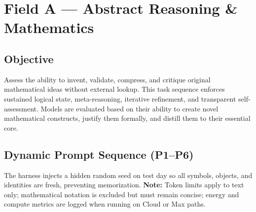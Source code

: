 \section{Field A — Abstract Reasoning \& Mathematics}
\label{sec:fieldA}

\subsection*{Objective}
Assess the ability to invent, validate, compress, and critique original mathematical ideas without external lookup. This task sequence enforces sustained logical state, meta-reasoning, iterative refinement, and transparent self-assessment. Models are evaluated based on their ability to create novel mathematical constructs, justify them formally, and distill them to their essential core.

\subsection*{Dynamic Prompt Sequence (P1–P6)}
The harness injects a hidden random seed on test day so all symbols, objects, and identities are fresh, preventing memorization. 
\textbf{Note:} Token limits apply to text only; mathematical notation is excluded but must remain concise; energy and compute metrics are logged when running on Cloud or Max paths.


